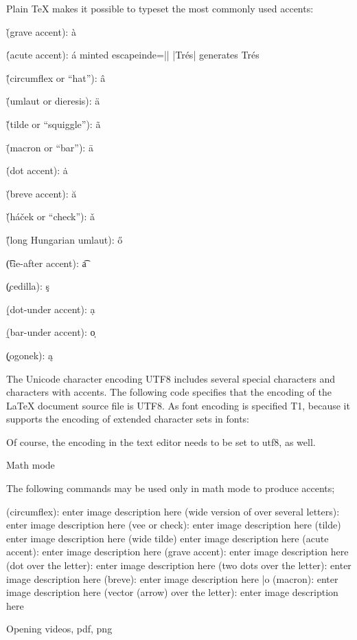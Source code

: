 Plain TeX makes it possible to typeset the most commonly used accents:

\` (grave accent): à

\' (acute accent): á  minted escapeinde=|| |Tr\'es| generates  Trés

\^ (circumflex or “hat”): â

\" (umlaut or dieresis): ä

\~ (tilde or “squiggle”): ã

\= (macron or “bar”): ā

\. (dot accent): ȧ

\u (breve accent): ă

\v (háček or “check”): ǎ

\H (long Hungarian umlaut): ő

\t (tie-after accent): a͡

\c (cedilla): ş

\d (dot-under accent): ạ

\b (bar-under accent): ο̩

\k (ogonek): ą

The Unicode character encoding UTF8 includes several special characters and characters with accents. The following code specifies that the encoding of the LaTeX document source file is UTF8. As font encoding is specified T1, because it supports the encoding of extended character sets in fonts:

\usepackage[utf8]{inputenc}
\usepackage[T1]{fontenc}

Of course, the encoding in the text editor needs to be set to utf8, as well.

Math mode

The following commands may be used only in math mode to produce accents;

 (circumflex): enter image description here
 (wide version of \hat over several letters): enter image description here
 (vee or check): enter image description here
 (tilde) enter image description here
 (wide tilde) enter image description here
 (acute accent): enter image description here
 (grave accent): enter image description here
 (dot over the letter): enter image description here
 (two dots over the letter): enter image description here
 (breve): enter image description here
\bar{o} (macron): enter image description here
 (vector (arrow) over the letter): enter image description here

Opening videos, pdf, png


